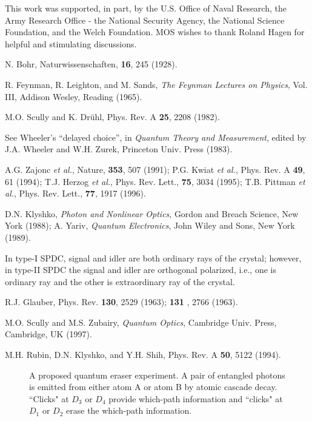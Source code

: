 This work was supported, in part, by the U.S. Office of Naval Research, the Army Research
Office - the National Security Agency, the National Science Foundation, and the Welch
Foundation. MOS wishes to thank Roland Hagen for helpful and stimulating discussions.

\begin{references}
  N. Bohr, Naturwissenschaften, {\bf 16}, 245 (1928).

  R. Feynman, R. Leighton, and M. Sands, {\em The Feynman
Lectures on Physics}, Vol. III, Addison Wesley, Reading (1965).

  M.O. Scully and K. Dr\"{u}hl, Phys. Rev. A {\bf 25}, 2208
(1982).

  See Wheeler's ``delayed choice'', in {\em Quantum Theory
and Measurement}, edited by J.A. Wheeler and W.H. Zurek, Princeton Univ. Press (1983).

  A.G. Zajonc {\em et al.}, Nature, {\bf 353}, 507 (1991);
P.G. Kwiat {\em et al.}, Phys. Rev. A {\bf 49}, 61 (1994); T.J. Herzog {\em et al.},
Phys. Rev. Lett., {\bf 75}, 3034 (1995); T.B. Pittman {\em et al.}, Phys. Rev. Lett.,
{\bf 77}, 1917 (1996).

  D.N. Klyshko, {\em Photon and Nonlinear Optics}, Gordon and
Breach Science, New York (1988); A. Yariv, {\em Quantum Electronics}, John Wiley and
Sons, New York (1989).

  In type-I SPDC, signal and idler are both ordinary rays of
the crystal; however, in type-II SPDC the
signal and idler are orthogonal polarized, i.e., one is ordinary
ray and the other is extraordinary ray of the crystal.

  R.J. Glauber, Phys. Rev. {\bf 130}, 2529 (1963); {\bf 131}%
, 2766 (1963).

  M.O. Scully and M.S. Zubairy, {\em Quantum Optics}, Cambridge
Univ. Press, Cambridge, UK (1997).

  M.H. Rubin, D.N. Klyshko, and Y.H. Shih, Phys. Rev. A {\bf 50}, 5122 (1994).

\end{references}

\begin{figure}[tbp]
\centerline{\epsfxsize=2.7in } \caption{A proposed quantum eraser
experiment. A pair of entangled photons is emitted from either atom A or atom B by atomic
cascade decay. ``Clicks" at $D_{3}$ or $D_{4}$ provide which-path information and
``clicks" at $D_{1}$ or $D_{2}$ erase the which-path information.}\label{fig:figure1}
\end{figure}

